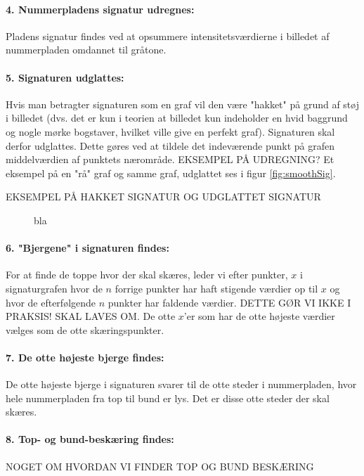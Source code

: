 \paragraph{4. Nummerpladens signatur udregnes:}
Pladens signatur findes ved at opsummere intensitetsværdierne i billedet af nummerpladen omdannet til gråtone.

\paragraph{5. Signaturen udglattes:}
Hvis man betragter signaturen som en graf vil den være "hakket" på grund af støj i billedet (dvs. det er kun i teorien at billedet kun indeholder en hvid baggrund og nogle mørke bogstaver, hvilket ville give en perfekt graf). Signaturen skal derfor udglattes. Dette gøres ved at tildele det indeværende punkt på grafen middelværdien af punktets nærområde. EKSEMPEL PÅ UDREGNING? Et eksempel på en "rå" graf og samme graf, udglattet ses i figur \vref{fig:smoothSig}.

EKSEMPEL PÅ HAKKET SIGNATUR OG UDGLATTET SIGNATUR

\begin{figure}[htp]
\label{fig:smoothSig}
\caption{bla}
\end{figure}

\paragraph{6. "Bjergene" i signaturen findes:}
For at finde de toppe hvor der skal skæres, leder vi efter punkter, $x$ i signaturgrafen hvor de $n$ forrige punkter har haft stigende værdier op til $x$ og hvor de efterfølgende $n$ punkter har faldende værdier. DETTE GØR VI IKKE I PRAKSIS! SKAL LAVES OM. De otte $x$'er som har de otte højeste værdier vælges som de otte skæringspunkter.

\paragraph{7. De otte højeste bjerge findes:}
De otte højeste bjerge i signaturen svarer til de otte steder i nummerpladen, hvor hele nummerpladen fra top til bund er lys. Det er disse otte steder der skal skæres.

\paragraph{8. Top- og bund-beskæring findes:}
NOGET OM HVORDAN VI FINDER TOP OG BUND BESKÆRING

